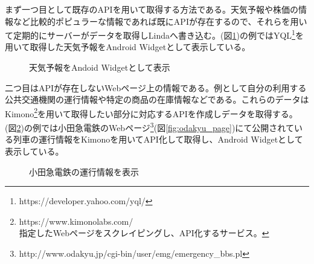 まず一つ目として既存のAPIを用いて取得する方法である。天気予報や株価の情報など比較的ポピュラーな情報であれば既にAPIが存在するので、それらを用いて定期的にサーバーがデータを取得しLindaへ書き込む。(図\ref{fig:weather_widget})の例ではYQL\footnote{https://developer.yahoo.com/yql/}を用いて取得した天気予報をAndroid Widgetとして表示している。

\begin{figure}[htbp]
  \begin{minipage}{\hsize}
    \begin{center}
    \end{center}
    \caption{天気予報をAndoid Widgetとして表示}
    \label{fig:weather_widget}
  \end{minipage}
\end{figure}

二つ目はAPIが存在しないWebページ上の情報である。例として自分の利用する公共交通機関の運行情報や特定の商品の在庫情報などである。これらのデータはKimono\footnote{https://www.kimonolabs.com/\\指定したWebページをスクレイピングし、API化するサービス。}を用いて取得したい部分に対応するAPIを作成しデータを取得する。(図\ref{fig:odakyu_widget})の例では小田急電鉄のWebページ\footnote{http://www.odakyu.jp/cgi-bin/user/emg/emergency\_bbs.pl}(図\ref{fig:odakyu_page})にて公開されている列車の運行情報をKimonoを用いてAPI化して取得し、Android Widgetとして表示している。

\begin{figure}[htbp]
  \begin{minipage}{\hsize}
    \begin{center}
    \end{center}
    \caption{小田急電鉄の運行情報を表示}
    \label{fig:odakyu_widget}
  \end{minipage}
\end{figure}

